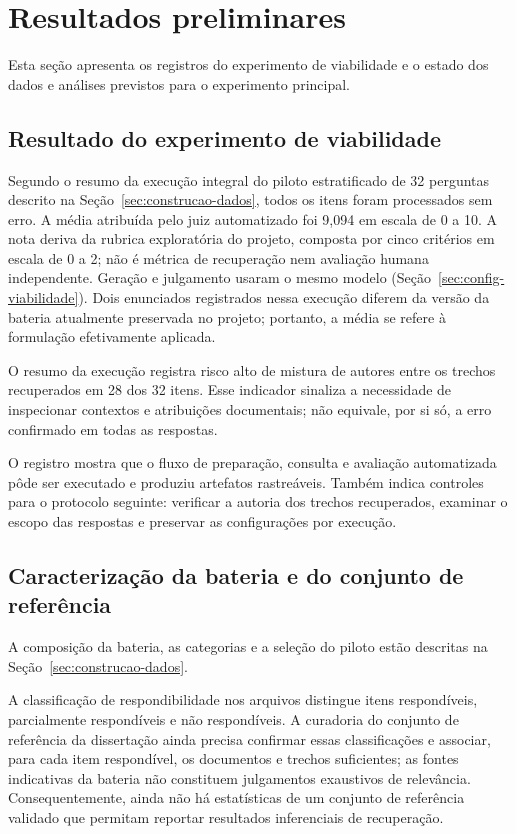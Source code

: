 \section{Resultados preliminares}
\label{sec:resultados}

Esta seção apresenta os registros do experimento de viabilidade e o estado dos dados e análises previstos para o experimento principal.

\subsection{Resultado do experimento de viabilidade}

Segundo o resumo da execução integral do piloto estratificado de 32 perguntas descrito na Seção~\ref{sec:construcao-dados}, todos os itens foram processados sem erro. A média atribuída pelo juiz automatizado foi 9,094 em escala de 0 a 10. A nota deriva da rubrica exploratória do projeto, composta por cinco critérios em escala de 0 a 2; não é métrica de recuperação nem avaliação humana independente. Geração e julgamento usaram o mesmo modelo (Seção~\ref{sec:config-viabilidade}). Dois enunciados registrados nessa execução diferem da versão da bateria atualmente preservada no projeto; portanto, a média se refere à formulação efetivamente aplicada.

O resumo da execução registra risco alto de mistura de autores entre os trechos recuperados em 28 dos 32 itens. Esse indicador sinaliza a necessidade de inspecionar contextos e atribuições documentais; não equivale, por si só, a erro confirmado em todas as respostas.

O registro mostra que o fluxo de preparação, consulta e avaliação automatizada pôde ser executado e produziu artefatos rastreáveis. Também indica controles para o protocolo seguinte: verificar a autoria dos trechos recuperados, examinar o escopo das respostas e preservar as configurações por execução.

\subsection{Caracterização da bateria e do conjunto de referência}

A composição da bateria, as categorias e a seleção do piloto estão descritas na Seção~\ref{sec:construcao-dados}.

A classificação de respondibilidade nos arquivos distingue itens respondíveis, parcialmente respondíveis e não respondíveis. A curadoria do conjunto de referência da dissertação ainda precisa confirmar essas classificações e associar, para cada item respondível, os documentos e trechos suficientes; as fontes indicativas da bateria não constituem julgamentos exaustivos de relevância. Consequentemente, ainda não há estatísticas de um conjunto de referência validado que permitam reportar resultados inferenciais de recuperação.

